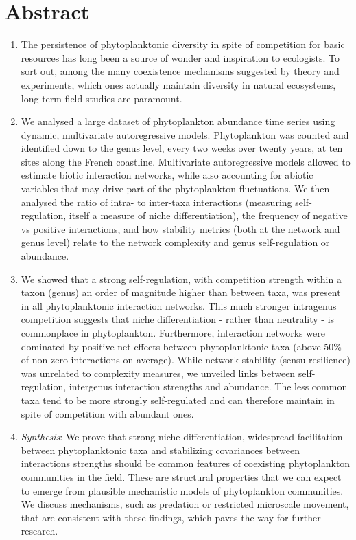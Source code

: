 \documentclass[10pt]{article}
\begin{document}
\section*{Abstract}
\begin{enumerate}
 \item  The persistence of phytoplanktonic diversity in spite of competition for basic resources has long been a source of wonder and inspiration to ecologists. To sort out, among the many coexistence mechanisms suggested by theory and experiments, which ones actually maintain diversity in natural ecosystems, long-term field studies are paramount.
 \item We analysed a large dataset of phytoplankton abundance time series using dynamic, multivariate autoregressive models. Phytoplankton was counted and identified down to the genus level, every two weeks over twenty years, at ten sites along the French coastline. Multivariate autoregressive models allowed to estimate biotic interaction networks, while also accounting for abiotic variables that may drive part of the phytoplankton fluctuations. We then analysed the ratio of intra- to inter-taxa interactions (measuring self-regulation, itself a measure of niche differentiation), the frequency of negative vs positive interactions, and how stability metrics (both at the network and genus level) relate to the network complexity and genus self-regulation or abundance.
 \item We showed that a strong self-regulation, with competition strength within a taxon (genus) an order of magnitude higher than between taxa, was present in all phytoplanktonic interaction networks. This much stronger intragenus competition suggests that niche differentiation - rather than neutrality - is commonplace in phytoplankton. Furthermore, interaction networks were dominated by positive net effects between phytoplanktonic taxa (above 50\% of non-zero interactions on average). While network stability (sensu resilience) was unrelated to complexity measures, we unveiled links between self-regulation, intergenus interaction strengths and abundance. The less common taxa tend to be more strongly self-regulated and can therefore maintain in spite of competition with abundant ones.
 \item \textit{Synthesis}: We prove that strong niche differentiation, widespread facilitation between phytoplanktonic taxa and stabilizing covariances between interactions strengths should be common features of coexisting phytoplankton communities in the field. These are structural properties that we can expect to emerge from plausible mechanistic models of phytoplankton communities. We discuss mechanisms, such as predation or restricted microscale movement, that are consistent with these findings, which paves the way for further research.
\end{enumerate}
\end{document}

